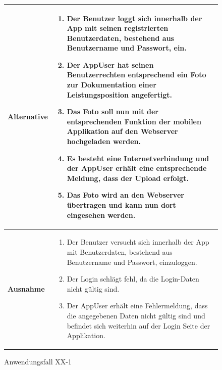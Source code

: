 			\begin{figure}[h]
	\centering
	\begin{tabularx}{\textwidth}{ X | X }
		\textbf{Alternative} & 
				\begin{enumerate}
					\item Der Benutzer loggt sich innerhalb der App mit seinen registrierten Benutzerdaten, bestehend aus Benutzername und Passwort,  ein.  
					 \item Der AppUser hat seinen Benutzerrechten entsprechend ein Foto zur Dokumentation einer Leistungsposition angefertigt.
					 \item Das Foto soll nun mit der entsprechenden Funktion der mobilen Applikation auf den Webserver hochgeladen werden.
					 \item Es besteht eine Internetverbindung und der AppUser erh\"alt eine entsprechende Meldung,  dass der Upload erfolgt.
					 \item Das Foto wird an den Webserver \"ubertragen und kann nun dort eingesehen werden.
				\end{enumerate}  \\ \hline
		\textbf{Ausnahme} &
				\begin{enumerate}
					\item Der Benutzer versucht sich innerhalb der App mit Benutzerdaten,  bestehend aus Benutzername und Passwort,  einzuloggen.  
					\item Der Login schl\"agt fehl,  da die Login-Daten nicht g\"ultig sind. 
					\item Der AppUser erh\"alt eine Fehlermeldung, dass die angegebenen Daten nicht g\"ultig sind und befindet sich weiterhin auf der Login Seite der Applikation.
				\end{enumerate} 
	\end{tabularx}
	\caption{Anwendungsfall XX-1}
	\label{fig:anwendungsfall-app-tabelle-xx-2}
\end{figure}
